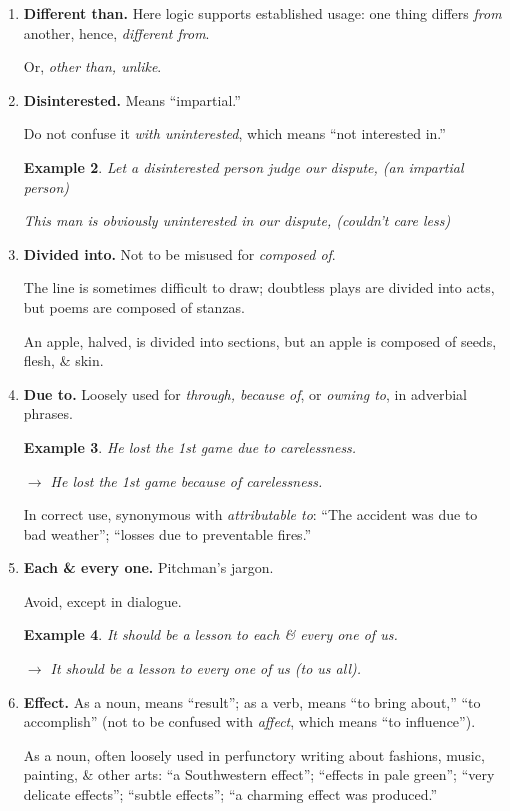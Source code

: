 \documentclass{article}
\newtheorem{example}{Example}
\begin{document}
\begin{enumerate}
\begin{example}
		$\to$ These data are misleading.
	\end{example}
	\item {\bf Different than.} Here logic supports established usage: one thing differs {\it from} another, hence, {\it different from}.
	
	Or, {\it other than, unlike}.
	\item {\bf Disinterested.} Means ``impartial.''
	
	Do not confuse it {\it with uninterested}, which means ``not interested in.''
	\begin{example}
		Let a disinterested person judge our dispute, (an impartial person)
		
		This man is obviously uninterested in our dispute, (couldn't care less)
	\end{example}
	\item {\bf Divided into.} Not to be misused for {\it composed of}.
	
	The line is sometimes difficult to draw; doubtless plays are divided into acts, but poems are composed of stanzas.
	
	An apple, halved, is divided into sections, but an apple is composed of seeds, flesh, \& skin.
	\item {\bf Due to.} Loosely used for {\it through, because of}, or {\it owning to}, in adverbial phrases.
	\begin{example}
		He lost the 1st game due to carelessness.
		
		$\to$ He lost the 1st game because of carelessness.
	\end{example}
	In correct use, synonymous with {\it attributable to}: ``The accident was due to bad weather''; ``losses due to preventable fires.''
	\item {\bf Each \& every one.} Pitchman's jargon.
	
	Avoid, except in dialogue.
	\begin{example}
		It should be a lesson to each \& every one of us.
		
		$\to$ It should be a lesson to every one of us (to us all).
	\end{example}
	\item {\bf Effect.} As a noun, means ``result''; as a verb, means ``to bring about,'' ``to accomplish'' (not to be confused with {\it affect}, which means ``to influence'').
	
	As a noun, often loosely used in perfunctory writing about fashions, music, painting, \& other arts: ``a Southwestern effect''; ``effects in pale green''; ``very delicate effects''; ``subtle effects''; ``a charming effect was produced.''
	

\end{enumerate}
\end{document}
